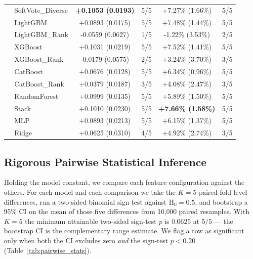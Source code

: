 \documentclass[10pt,journal,compsoc]{IEEEtran}
\begin{document}
\begin{table}[tbp]
\begin{tabular}{llcccc}
                       & SoftVote\_Diverse  & \textbf{+0.1053 (0.0193)}        & 5/5 & +7.27\% (1.66\%)                 & 5/5 \\
                       & LightGBM           & +0.0893 (0.0175)                 & 5/5 & +7.48\% (1.44\%)                 & 5/5 \\
                       & LightGBM\_Rank     & -0.0559 (0.0627)                 & 1/5 & -1.22\% (3.53\%)                 & 2/5 \\
                       & XGBoost            & +0.1031 (0.0219)                 & 5/5 & +7.52\% (1.41\%)                 & 5/5 \\
                       & XGBoost\_Rank      & -0.0179 (0.0575)                 & 2/5 & +3.24\% (3.70\%)                 & 3/5 \\
                       & CatBoost           & +0.0676 (0.0128)                 & 5/5 & +6.34\% (0.96\%)                 & 5/5 \\
                       & CatBoost\_Rank     & +0.0379 (0.0187)                 & 3/5 & +4.08\% (2.47\%)                 & 3/5 \\
                       & RandomForest       & +0.0999 (0.0135)                 & 5/5 & +5.89\% (1.50\%)                 & 5/5 \\
                       & Stack              & +0.1010 (0.0230)                 & 5/5 & \textbf{+7.66\% (1.58\%)}        & 5/5 \\
                       & MLP                & +0.0893 (0.0213)                 & 5/5 & +6.15\% (1.37\%)                 & 5/5 \\
                       & Ridge              & +0.0625 (0.0310)                 & 4/5 & +4.92\% (2.74\%)                 & 3/5 \\
\bottomrule
\end{tabular}
\end{table}

\subsection{Rigorous Pairwise Statistical Inference}
Holding the model constant, we compare each feature configuration against the others. For each model and each comparison we take the $K=5$ paired fold-level differences, run a two-sided binomial sign test against $\text{H}_0=0.5$, and bootstrap a 95\% CI on the mean of those five differences from 10{,}000 paired resamples. With $K=5$ the minimum attainable two-sided sign-test $p$ is $0.0625$ at $5/5$ — the bootstrap CI is the complementary range estimate. We flag a row as significant only when both the CI excludes zero \emph{and} the sign-test $p<0.20$ (Table~\ref{tab:pairwise_stats}).
\end{document}
